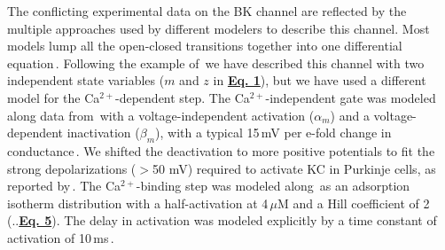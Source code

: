 \documentclass[12pt]{article}
\begin{document}
The conflicting experimental data on the BK channel are reflected by the multiple approaches used by different modelers to describe this channel. Most models lump all the open-closed transitions together into one differential equation\,\cite{hines84:_effic, Moczydlowski:1983qa, D:1982lh, Yamada-W:1989bs}. Following the example of\,\cite{Traub-R-D:1991mi} we have described this channel with two independent state variables ($m$ and $z$ in \href{pub-purkinje-deschutter-equations/pub-purkinje-deschutter-equations.tex}{\bf Eq. 1}), but we have used a different model for the Ca$^{2+}$-dependent step. The Ca$^{2+}$-independent gate was modeled along data from\,\cite{Gola:1990pi} with a voltage-independent activation ($\alpha_m$) and a voltage-dependent inactivation ($\beta_m$), with a typical 15\,mV per e-fold change in conductance\,\cite{Franciolini:1988fu, Latorre:1989fu}. We shifted the deactivation to more positive potentials to fit the strong depolarizations ($>$50 mV) required to activate KC in Purkinje cells, as reported by\,\cite{Gruol:1991dz}. The Ca$^{2+}$-binding step was modeled along\,\cite{Franciolini:1988fu} as an adsorption isotherm distribution with a half-activation at 4\,$\mu$M and a Hill coefficient of 2 (..\href{pub-purkinje-deschutter-equations/pub-purkinje-deschutter-equations.tex}{\bf Eq. 5}). The delay in activation was modeled explicitly by a time constant of activation of 10\,ms\,\cite{Gola:1990pi, Ikemoto:1989lh, L:1989ff}.



\end{document}
